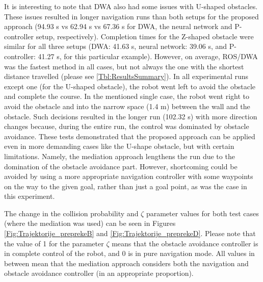It is interesting to note that DWA also had some issues with U-shaped obstacles. These issues resulted in longer navigation runs than both setups for the proposed approach (94.93 s vs 62.94 s vs 67.36 s for DWA, the neural network and P-controller setup, respectively). Completion times for the Z-shaped obstacle were similar for all three setups (DWA: 41.63 s, neural network: 39.06 s, and P-controller: 41.27 s, for this particular example). However, on average, ROS/DWA was the fastest method in all cases, but not always the one with the shortest distance travelled (please see \cref{Tbl:ResultsSummary}). In all experimental runs except one (for the U-shaped obstacle), the robot went left to avoid the obstacle and complete the course. In the mentioned single case, the robot went right to avoid the obstacle and into the narrow space (1.4 m) between the wall and the obstacle. Such decisions resulted in the longer run (102.32 s) with more direction changes because, during the entire run, the control was dominated by obstacle avoidance. These tests demonstrated that the proposed approach can be applied even in more demanding cases like the U-shape obstacle, but with certain limitations. Namely, the mediation approach lengthens the run due to the domination of the obstacle avoidance part. However, shortcoming could be avoided by using a more appropriate navigation controller with some waypoints on the way to the given goal, rather than just a goal point, as was the case in this experiment.

The change in the collision probability and $\zeta$ parameter values for both test cases (where the mediation was used) can be seen in Figures \ref{Fig:Trajektorije_preprekeB} and \ref{Fig:Trajektorije_preprekeD}. Please note that the value of 1 for the parameter $\zeta$ means that the obstacle avoidance controller is in complete control of the robot, and 0 is in pure navigation mode. All values in between mean that the mediation approach considers both the navigation and obstacle avoidance controller (in an appropriate proportion).

